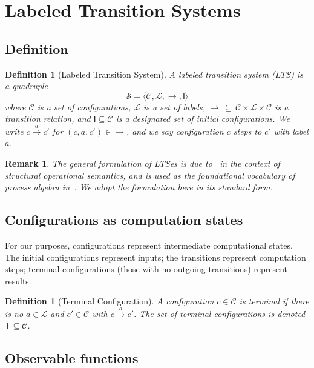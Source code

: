\documentclass[twocolumn,11pt,a4paper]{article}
\newtheorem{definition}[theorem]{Definition}
\newtheorem{remark}[theorem]{Remark}
\newcommand{\Conf}{\mathcal{C}}
\newcommand{\Lab}{\mathcal{L}}
\newcommand{\Term}{\mathsf{T}}
\newcommand{\Init}{\mathsf{I}}
\newcommand{\Sys}{\mathcal{S}}
\begin{document}
\section{Labeled Transition Systems}
\label{sec:lts}

\subsection{Definition}

\begin{definition}[Labeled Transition System]
\label{def:lts}
A \emph{labeled transition system} (LTS) is a quadruple
\[
\Sys = \langle \Conf, \Lab, \to, \Init \rangle
\]
where $\Conf$ is a set of \emph{configurations}, $\Lab$ is a set of \emph{labels}, $\to\, \subseteq\, \Conf \times \Lab \times \Conf$ is a \emph{transition relation}, and $\Init \subseteq \Conf$ is a designated set of \emph{initial configurations}. We write $c \xrightarrow{a} c'$ for $(c, a, c') \in \to$, and we say configuration $c$ \emph{steps to} $c'$ with label $a$.
\end{definition}

\begin{remark}
The general formulation of LTSes is due to~\citet{plotkin1981} in the context of structural operational semantics, and is used as the foundational vocabulary of process algebra in~\citet{milner1989,hoare1985csp,bergstra1984acp}. We adopt the formulation here in its standard form.
\end{remark}

\subsection{Configurations as computation states}

For our purposes, configurations represent intermediate computational states. The initial configurations represent inputs; the transitions represent computation steps; terminal configurations (those with no outgoing transitions) represent results.

\begin{definition}[Terminal Configuration]
\label{def:terminal}
A configuration $c \in \Conf$ is \emph{terminal} if there is no $a \in \Lab$ and $c' \in \Conf$ with $c \xrightarrow{a} c'$. The set of terminal configurations is denoted $\Term \subseteq \Conf$.
\end{definition}

\subsection{Observable functions}
\end{document}
